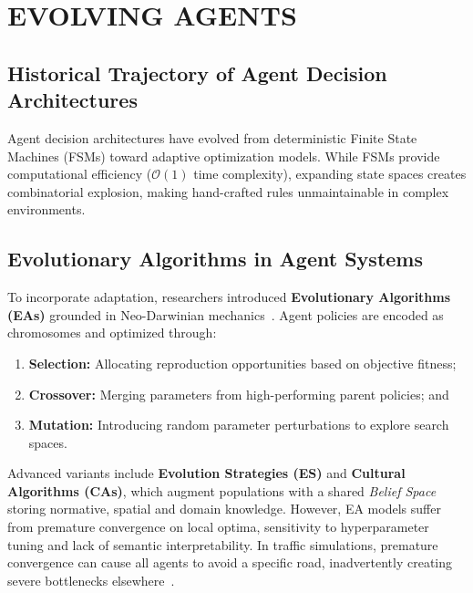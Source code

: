 \documentclass[12pt,a4paper]{report}
\begin{document}

\chapter{EVOLVING AGENTS}
\label{chap:evolving_agents}

\section{Historical Trajectory of Agent Decision Architectures}
\label{sec:history_agents}

Agent decision architectures have evolved from deterministic Finite State Machines (FSMs) toward adaptive optimization models. While FSMs provide computational efficiency ($\mathcal{O}(1)$ time complexity), expanding state spaces creates combinatorial explosion, making hand-crafted rules unmaintainable in complex environments.

\section{Evolutionary Algorithms in Agent Systems}
\label{sec:eas}

To incorporate adaptation, researchers introduced \textbf{Evolutionary Algorithms (EAs)} grounded in Neo-Darwinian mechanics~\cite{holland1992adaptation}. Agent policies are encoded as chromosomes and optimized through:
\begin{enumerate}[label=\arabic*.]
    \item \textbf{Selection:} Allocating reproduction opportunities based on objective fitness;
    \item \textbf{Crossover:} Merging parameters from high-performing parent policies; and
    \item \textbf{Mutation:} Introducing random parameter perturbations to explore search spaces.
\end{enumerate}

Advanced variants include \textbf{Evolution Strategies (ES)} and \textbf{Cultural Algorithms (CAs)}, which augment populations with a shared \textit{Belief Space} storing normative, spatial and domain knowledge. However, EA models suffer from premature convergence on local optima, sensitivity to hyperparameter tuning and lack of semantic interpretability. In traffic simulations, premature convergence can cause all agents to avoid a specific road, inadvertently creating severe bottlenecks elsewhere~\cite{adornetto2025generative}.
\end{document}

